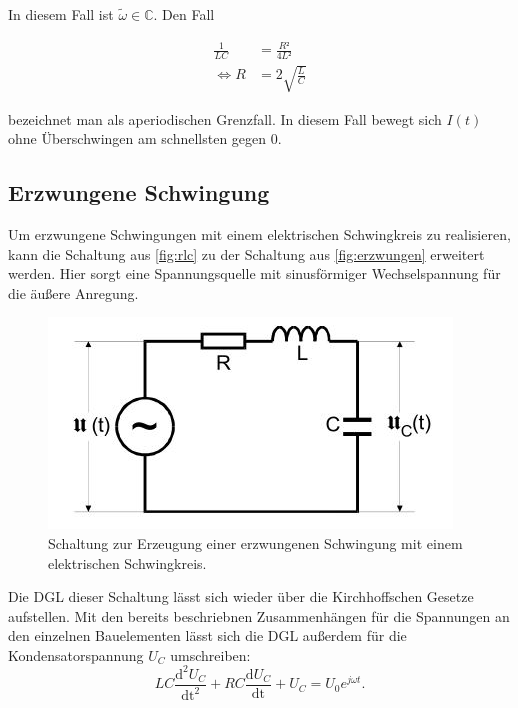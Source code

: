 \noindent In diesem Fall ist $\tilde{\omega} \in \mathbb{C}$.
Den Fall

\begin{align*}
\frac{1}{LC} &= \frac{R²}{4L²}\\
\iff R &= 2\sqrt{\frac{L}{C}}
\end{align*}

\noindent bezeichnet man als aperiodischen Grenzfall. In diesem Fall bewegt sich $I(t)$ ohne 
Überschwingen am schnellsten gegen 0. 
\subsection{Erzwungene Schwingung}
Um erzwungene Schwingungen mit einem elektrischen Schwingkreis zu realisieren, kann die Schaltung aus \autoref{fig:rlc} zu der Schaltung aus \autoref{fig:erzwungen} erweitert werden. Hier sorgt eine Spannungsquelle mit sinusförmiger Wechselspannung für die äußere Anregung.
\begin{figure}[H]
    \centering
    \includegraphics{bilder/erzwungen.JPG}
    \caption{Schaltung zur Erzeugung einer erzwungenen Schwingung mit einem elektrischen Schwingkreis. \cite{sample}}
    \label{fig:erzwungen}
  \end{figure}
\noindent
Die DGL dieser Schaltung lässt sich wieder über die Kirchhoffschen Gesetze aufstellen. Mit den bereits beschriebnen Zusammenhängen für die Spannungen an den einzelnen Bauelementen lässt sich die DGL außerdem für die Kondensatorspannung $U_C$ umschreiben:
\begin{equation}
    LC \frac{\text{d}^2 U_C}{\text{dt}^2} + RC \frac{\text{d} U_C}{\text{dt}} + U_C = U_0 e^{j \omega t}.
\end{equation}
    
